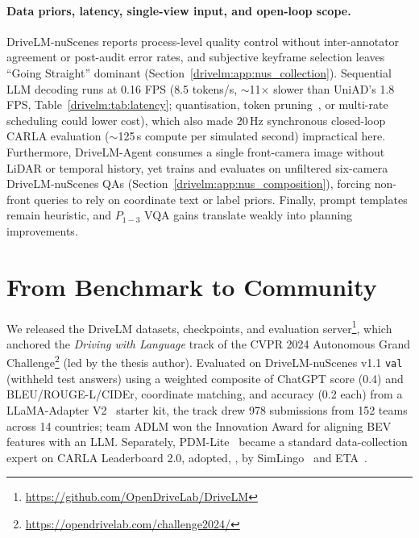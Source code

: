 \paragraph{Data priors, latency, single-view input, and open-loop scope.}
DriveLM-nuScenes reports process-level quality control without inter-annotator agreement or post-audit error rates, and subjective keyframe selection leaves ``Going Straight'' dominant (Section~\ref{drivelm:app:nus_collection}). Sequential LLM decoding runs at 0.16 FPS (8.5 tokens/s, $\sim$11$\times$ slower than UniAD's 1.8 FPS, Table~\ref{drivelm:tab:latency}; quantisation, token pruning~\cite{xiao2023smoothquant,shi2023crossget}, or multi-rate scheduling could lower cost), which also made 20\,Hz synchronous closed-loop CARLA evaluation ($\sim$125\,s compute per simulated second) impractical here. Furthermore, DriveLM-Agent consumes a single front-camera image without LiDAR or temporal history, yet trains and evaluates on unfiltered six-camera DriveLM-nuScenes QAs (Section~\ref{drivelm:app:nus_composition}), forcing non-front queries to rely on coordinate text or label priors. Finally, prompt templates remain heuristic, and $P_{1-3}$ VQA gains translate weakly into planning improvements.

\section{From Benchmark to Community}\label{drivelm:sec:community}

We released the DriveLM datasets, checkpoints, and evaluation server\footnote{\url{https://github.com/OpenDriveLab/DriveLM}}, which anchored the \emph{Driving with Language} track of the CVPR 2024 Autonomous Grand Challenge\footnote{\url{https://opendrivelab.com/challenge2024/}} (led by the thesis author). Evaluated on DriveLM-nuScenes v1.1 \texttt{val} (withheld test answers) using a weighted composite of ChatGPT score (0.4) and BLEU/ROUGE-L/CIDEr, coordinate matching, and accuracy (0.2 each) from a LLaMA-Adapter V2~\cite{gao2023llamaadapterv2} starter kit, the track drew 978 submissions from 152 teams across 14 countries; team ADLM won the Innovation Award for aligning BEV features with an LLM. Separately, PDM-Lite~\cite{beisswenger2024pdmlite} became a standard data-collection expert on CARLA Leaderboard 2.0, adopted, \eg, by SimLingo~\cite{renz2025simlingo} and ETA~\cite{hamdan2025eta}.

